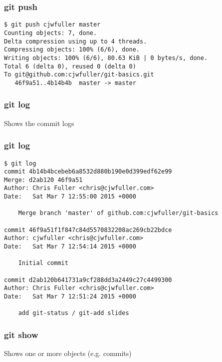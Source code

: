 \documentclass{beamer}
\begin{document}

\begin{frame}[fragile]
\frametitle{git push}
	\scriptsize
	\begin{verbatim}
$ git push cjwfuller master
Counting objects: 7, done.
Delta compression using up to 4 threads.
Compressing objects: 100% (6/6), done.
Writing objects: 100% (6/6), 80.63 KiB | 0 bytes/s, done.
Total 6 (delta 0), reused 0 (delta 0)
To git@github.com:cjwfuller/git-basics.git
   46f9a51..4b14b4b  master -> master
	\end{verbatim}
\end{frame}


\begin{frame}
\frametitle{git log}
Shows the commit logs
\end{frame}


\begin{frame}[fragile]
\frametitle{git log}
	\scriptsize
	\begin{verbatim}
$ git log
commit 4b14b4bcebeb6a8532d880b190e0d399edf62e99
Merge: d2ab120 46f9a51
Author: Chris Fuller <chris@cjwfuller.com>
Date:   Sat Mar 7 12:55:00 2015 +0000

    Merge branch 'master' of github.com:cjwfuller/git-basics

commit 46f9a51f1f847c84d5570832208ac269cb22bdce
Author: cjwfuller <chris@cjwfuller.com>
Date:   Sat Mar 7 12:54:14 2015 +0000

    Initial commit

commit d2ab120b641731a9cf288dd3a2449c27c4499300
Author: Chris Fuller <chris@cjwfuller.com>
Date:   Sat Mar 7 12:51:24 2015 +0000

    add git-status / git-add slides
	\end{verbatim}
\end{frame}



\begin{frame}
\frametitle{git show}
Shows one or more objects (e.g. commits)
\end{frame}

\end{document}
